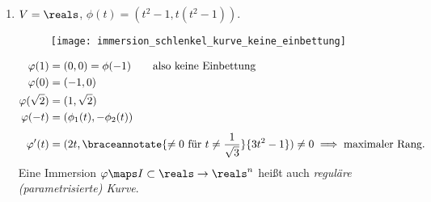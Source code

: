 \begin{beispiele*}
  \begin{enumerate}[label=\rechtsklammer{\roman*}]
    \item \label{immersion_beispiel:schlenkel_kurve} \( V=\reals \), \( \phi(t)=(t^2-1,t(t^2-1)) \). 
    \begin{figure}[H]
      \centering
      \texttt{[image: immersion\_schlenkel\_kurve\_keine\_einbettung]}
      \label{fig:immersion_schlenkel_kurve_keine_einbettung}
    \end{figure}
    \begin{align*}
      \varphi(1)&=(0,0)=\phi(-1)\qquad \text{also keine Einbettung}\\
      \varphi(0)&=(-1,0)\\
      \varphi(\sqrt{2})&=(1,\sqrt{2})\\
      \varphi(-t)&=(\phi_1(t),-\phi_2(t))\\[1ex]
      \varphi'(t)&=(2t,\braceannotate{\neq 0 \text{ für }t\neq \frac{1}{\sqrt{3}}}{3t^2-1})\neq 0\implies \text{maximaler Rang}.
    \end{align*}
    Eine Immersion \( \varphi\maps I\subset \reals\to \reals^n \) heißt auch \emph{reguläre (parametrisierte) Kurve}.
    

\end{enumerate}
\end{beispiele*}
